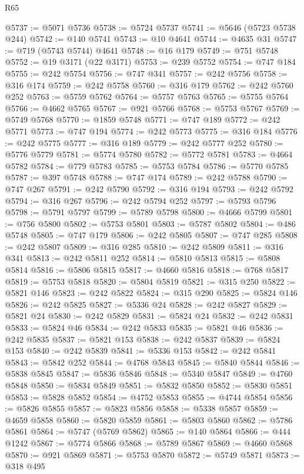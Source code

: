 \begin{lexlean}{R65}
\begin{coremodule}
{@5737 := @5071 @5736
@5738 := @5724 @5737
@5741 := @5646 (@5723 @5738 @244)
@5742 := @140 @5741
@5743 := @10 @4641
@5744 := @4635 @31
@5747 := @719 (@5743 @5744) @4641
@5748 := @16 @179
@5749 := @751 @5748
@5752 := @19 @3171 (@22 @3171)
@5753 := @239 @5752
@5754 := @747 @184
@5755 := @242 @5754
@5756 := @747 @341
@5757 := @242 @5756
@5758 := @316 @174
@5759 := @242 @5758
@5760 := @316 @179
@5762 := @242 @5760 @252
@5763 := @5759 @5762
@5764 := @5757 @5763
@5765 := @5755 @5764
@5766 := @4662 @5765
@5767 := @921 @5766
@5768 := @5753 @5767
@5769 := @5749 @5768
@5770 := @1859 @5748
@5771 := @747 @189
@5772 := @242 @5771
@5773 := @747 @194
@5774 := @242 @5773
@5775 := @316 @184
@5776 := @242 @5775
@5777 := @316 @189
@5779 := @242 @5777 @252
@5780 := @5776 @5779
@5781 := @5774 @5780
@5782 := @5772 @5781
@5783 := @4664 @5782
@5784 := @779 @5783
@5785 := @5753 @5784
@5786 := @5770 @5785
@5787 := @397 @5748
@5788 := @747 @174
@5789 := @242 @5788
@5790 := @747 @267
@5791 := @242 @5790
@5792 := @316 @194
@5793 := @242 @5792
@5794 := @316 @267
@5796 := @242 @5794 @252
@5797 := @5793 @5796
@5798 := @5791 @5797
@5799 := @5789 @5798
@5800 := @4666 @5799
@5801 := @756 @5800
@5802 := @5753 @5801
@5803 := @5787 @5802
@5804 := @486 @5748
@5805 := @747 @179
@5806 := @242 @5805
@5807 := @747 @285
@5808 := @242 @5807
@5809 := @316 @285
@5810 := @242 @5809
@5811 := @316 @341
@5813 := @242 @5811 @252
@5814 := @5810 @5813
@5815 := @5808 @5814
@5816 := @5806 @5815
@5817 := @4660 @5816
@5818 := @768 @5817
@5819 := @5753 @5818
@5820 := @5804 @5819
@5821 := @315 @250
@5822 := @5821 @146
@5823 := @242 @5822
@5824 := @315 @290
@5825 := @5824 @146
@5826 := @242 @5825
@5827 := @5336 @24
@5828 := @242 @5827
@5829 := @5821 @24
@5830 := @242 @5829
@5831 := @5824 @24
@5832 := @242 @5831
@5833 := @5824 @46
@5834 := @242 @5833
@5835 := @5821 @46
@5836 := @242 @5835
@5837 := @5821 @153
@5838 := @242 @5837
@5839 := @5824 @153
@5840 := @242 @5839
@5841 := @5336 @153
@5842 := @242 @5841
@5843 := @5842 @252
@5844 := @4768 @5843
@5845 := @5840 @5844
@5846 := @5838 @5845
@5847 := @5836 @5846
@5848 := @5340 @5847
@5849 := @4760 @5848
@5850 := @5834 @5849
@5851 := @5832 @5850
@5852 := @5830 @5851
@5853 := @5828 @5852
@5854 := @4752 @5853
@5855 := @4744 @5854
@5856 := @5826 @5855
@5857 := @5823 @5856
@5858 := @5338 @5857
@5859 := @4659 @5858
@5860 := @5820 @5859
@5861 := @5803 @5860
@5862 := @5786 @5861
@5864 := @5747 (@5769 @5862)
@5865 := @140 @5864
@5866 := @444 @1242
@5867 := @5774 @5866
@5868 := @5789 @5867
@5869 := @4660 @5868
@5870 := @921 @5869
@5871 := @5753 @5870
@5872 := @5749 @5871
@5873 := @318 @495
}
\end{coremodule}
\end{lexlean}
